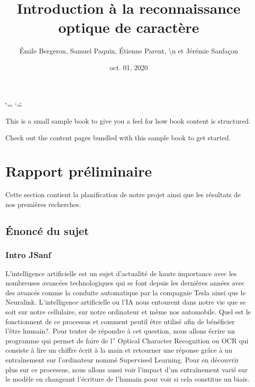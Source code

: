 \documentclass[letterpaper,10pt,french]{sphinxmanual}
\title{Introduction à la reconnaissance optique de caractère}
\date{oct. 01, 2020}
\author{Émile Bergeron, Samuel Paquin, Étienne Parent, \textbackslash{}n et Jérémie Sanfaçon}
\begin{document}
\ifdefined\shorthandoff
  \ifnum\catcode`\=\string=\active\shorthandoff{=}\fi
  \ifnum\catcode`\"=\active{}\fi
\fi

\pagestyle{empty}
\sphinxmaketitle
\pagestyle{plain}
\sphinxtableofcontents
\pagestyle{normal}
\label{\detokenize{intro::doc}}


This is a small sample book to give you a feel for how book content is
structured.

Check out the content pages bundled with this sample book to get started.


\chapter{Rapport préliminaire}
\label{\detokenize{rapport_preliminaire:rapport-preliminaire}}\label{\detokenize{rapport_preliminaire::doc}}
Cette section contient la planification de notre projet ainsi que les
résultats de nos premières recherches.


\section{Énoncé du sujet}
\label{\detokenize{enonce_sujet:enonce-du-sujet}}\label{\detokenize{enonce_sujet::doc}}

\subsection{Intro JSanf}
\label{\detokenize{enonce_sujet:intro-jsanf}}
L’intelligence artificielle est un sujet d’actualité de haute importance avec les
nombreuses avancées
technologiques qui se font depuis les dernières années avec des avancés comme la
conduite automatique
par la compagnie Tesla ainsi que le Neuralink. L’intelligence artificielle ou
l’IA nous entourent
dans notre vie que se soit sur notre cellulaire, sur notre ordinateur et même nos automobile.
Quel est le fonctionnent de ce processus et comment peut\sphinxhyphen{}il être utilisé afin de
bénéficier l’être humain?. Pour tenter de répondre à cet question, nous allons
écrire un programme qui permet de faire de l” Optical Character Recognition ou OCR
qui consiste à lire un chiffre écrit à la main et retourner une réponse grâce à
un entraînement sur l’ordinateur nommé Supervised Learning. Pour en découvrir
plus sur ce processus, nous allons aussi voir l’impact d’un entraînement varié
sur le modèle en changeant l’écriture de l’humain pour voir si cela constitue un
biais.
\end{document}
